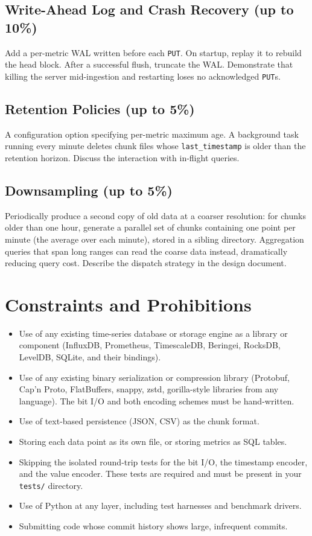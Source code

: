 \documentclass[11pt,a4paper]{article}
\begin{document}
\subsection{Write-Ahead Log and Crash Recovery (up to 10\%)}
Add a per-metric WAL written before each \texttt{PUT}. On startup, replay it to rebuild the head block. After a successful flush, truncate the WAL. Demonstrate that killing the server mid-ingestion and restarting loses no acknowledged \texttt{PUT}s.

\subsection{Retention Policies (up to 5\%)}
A configuration option specifying per-metric maximum age. A background task running every minute deletes chunk files whose \texttt{last\_timestamp} is older than the retention horizon. Discuss the interaction with in-flight queries.

\subsection{Downsampling (up to 5\%)}
Periodically produce a second copy of old data at a coarser resolution: for chunks older than one hour, generate a parallel set of chunks containing one point per minute (the average over each minute), stored in a sibling directory. Aggregation queries that span long ranges can read the coarse data instead, dramatically reducing query cost. Describe the dispatch strategy in the design document.

\section{Constraints and Prohibitions}

\begin{notebox}
\begin{itemize}
\item Use of any existing time-series database or storage engine as a library or component (InfluxDB, Prometheus, TimescaleDB, Beringei, RocksDB, LevelDB, SQLite, and their bindings).
\item Use of any existing binary serialization or compression library (Protobuf, Cap'n Proto, FlatBuffers, snappy, zstd, gorilla-style libraries from any language). The bit I/O and both encoding schemes must be hand-written.
\item Use of text-based persistence (JSON, CSV) as the chunk format.
\item Storing each data point as its own file, or storing metrics as SQL tables.
\item Skipping the isolated round-trip tests for the bit I/O, the timestamp encoder, and the value encoder. These tests are required and must be present in your \texttt{tests/} directory.
\item Use of Python at any layer, including test harnesses and benchmark drivers.
\item Submitting code whose commit history shows large, infrequent commits.
\end{itemize}
\end{notebox}
\end{document}
